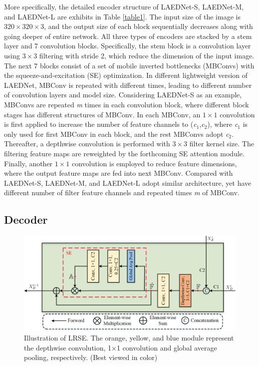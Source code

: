 \documentclass[review]{elsarticle}
\begin{document}
More specifically, the detailed encoder structure of LAEDNet-S, LAEDNet-M, and LAEDNet-L are exhibits in Table \ref{table1}. The input size of the image is $320\times320\times3$, and the output size of each block sequentially decreases along with going deeper of entire network. All three types of encoders are stacked by a stem layer and 7 convolution blocks. Specifically, the stem block is a convolution layer using $3\times3$ filtering with stride 2, which reduce the dimension of the input image. The next 7 blocks consist of a set of mobile inverted bottlenecks (MBConvs)\cite{2018MobileNetV2} with the squeeze-and-excitation (SE)\cite{2017Squeeze} optimization. In different lightweight version of LAEDNet, MBConv is repeated with different times, leading to different number of convolution layers and model size. Considering LAEDNet-S as an example, MBConvs are repeated \emph{m} times in each convolution block, where different block stages has different structures of MBConv. In each MBConv, an $1\times1$ convolution is first applied to increase the number of feature channels to (\emph{c}$_{1}$,\emph{c}$_{2}$), where \emph{c}$_{1}$ is only used for first MBConv in each block, and the rest MBConvs adopt \emph{c}$_{2}$. Thereafter, a depthwise convolution is performed with $3\times3$ filter kernel size. The filtering feature maps are reweighted by the forthcoming SE attention module. Finally, another $1\times1$ convolution is employed to reduce feature dimensions, where the output feature maps are fed into next MBConv. Compared with LAEDNet-S, LAEDNet-M, and LAEDNet-L adopt similar architecture, yet have different number of filter feature channels and repeated times \emph{m} of MBConv.

\subsection{Decoder}

\begin{figure}[!t]
	\includegraphics[width=\textwidth]{LRSE-Decoder.png}
	\caption{Illustration of LRSE. The orange, yellow, and blue module represent the depthwise convolution, 1×1 convolution and global average pooling, respectively. (Best viewed in color)}
	\label{fig3}
	\end{figure}
\end{document}
